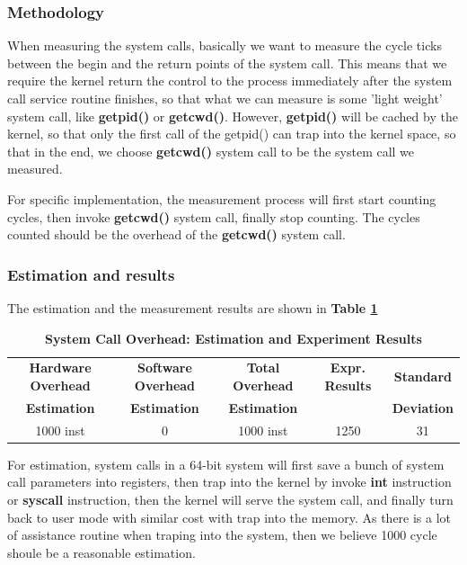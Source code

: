 \subsubsection{Methodology}

When measuring the system calls, basically we want to measure the cycle ticks between the begin and the return points of the system call. This means that we require the kernel return the control to the process immediately after the system call service routine finishes, so that what we can measure is some 'light weight' system call, like \textbf{getpid()} or \textbf{getcwd()}. However, \textbf{getpid()} will be cached by the kernel, so that only the first call of the getpid() can trap into
the kernel space, so that in the end, we choose \textbf{getcwd()} system call to be the system call we measured.

For specific implementation, the measurement process will first start counting cycles, then invoke \textbf{getcwd()} system call, finally stop counting. The cycles counted should be the overhead of the \textbf{getcwd()} system call.


\subsubsection{Estimation and results}

The estimation and the measurement results are shown in \textbf{Table \ref{measurement_syscall_table}}

\begin{table}[ht]
  \centering
  \caption{\textbf{System Call Overhead: Estimation and Experiment Results}}
  \begin{threeparttable}
  \begin{tabular}{ccccc}
  \hline
      \textbf{Hardware Overhead} & \textbf{Software Overhead } & \textbf{Total Overhead} & \textbf{Expr. Results} & \textbf{Standard}\\
      \textbf{Estimation}       &  \textbf{Estimation}         & \textbf{Estimation}  &     & \textbf{Deviation}\\
  \hline
  1000 inst & 0 & 1000 inst & 1250 & 31 \\
  \hline
  \end{tabular}
  \end{threeparttable}
  \label{measurement_syscall_table}
\end{table}

For estimation, system calls in a 64-bit system will first save a bunch of system call parameters into registers, then trap into the kernel by invoke \textbf{int} instruction or \textbf{syscall} instruction, then the kernel will serve the system call, and finally turn back to user mode with similar cost with trap into the memory. As there is a lot of assistance routine when traping into the system, then we believe 1000 cycle shoule be a reasonable estimation.

